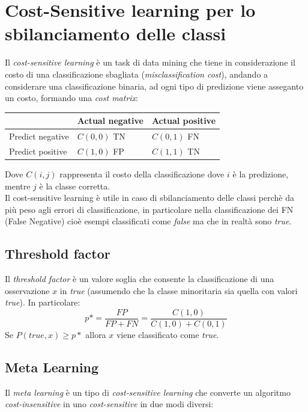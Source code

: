 \documentclass[italian,12pt,a4paper]{article}
\begin{document}
	\section{Cost-Sensitive learning per lo sbilanciamento delle classi}
	Il \textit{cost-sensitive learning} è un task di data mining che tiene in considerazione il costo di una classificazione sbagliata (\textit{misclassification cost}), andando a considerare una classificazione binaria, ad ogni tipo di predizione viene asseganto un costo, formando una \textit{cost matrix}: \\
	\begin{center}
		\begin{tabularx}{0.8\textwidth} { 
				| >{\centering\arraybackslash}X 
				| >{\centering\arraybackslash}X 
				| >{\centering\arraybackslash}X | }
			\hline
			 & Actual negative & Actual positive \\
			\hline
			Predict negative & $C(0, 0)$ TN & $C(0, 1)$ FN \\
			\hline
			Predict positive  & $C(1, 0)$ FP & $C(1, 1)$ TN \\
			\hline
		\end{tabularx}
	\end{center}

	Dove $C(i, j)$ rappresenta il costo della classificazione dove $i$ è la predizione, mentre $j$ è la classe corretta. \\
	Il cost-sensitive learning è utile in caso di sbilanciamento delle classi perchè da più peso agli errori di classificazione, in particolare nella classificazione dei FN (False Negative) cioè esempi classificati come \textit{false} ma che in realtà sono \textit{true}.
	
	\subsection{Threshold factor}
	Il \textit{threshold factor} è un valore soglia che consente la classificazione di una osservazione $x$ in \textit{true} (assumendo che la classe minoritaria sia quella con valori \textit{true}).
	\linebreak
	In particolare: $$p* = \frac{FP}{FP + FN} = \frac{C(1, 0)}{C(1, 0) + C(0, 1)}$$
	Se $P(true, x) \ge p*$ allora $x$ viene classificato come \textit{true}.
	
	\subsection{Meta Learning}
	Il \textit{meta learning} è un tipo di \textit{cost-sensitive learning} che converte un algoritmo \textit{cost-insensitive} in uno \textit{cost-sensitive} in due modi diversi:
	
\end{document}
